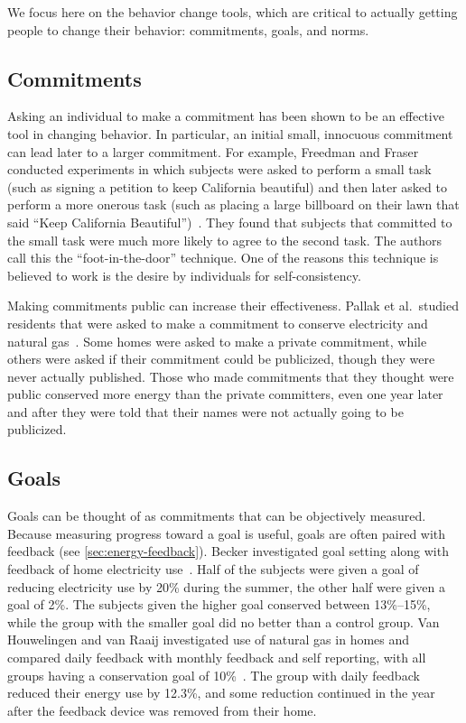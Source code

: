 We focus here on the behavior change tools, which are critical to actually getting people to change their behavior: commitments, goals, and norms.

\subsection{Commitments}
\label{sec:rl-commitments}

Asking an individual to make a commitment has been shown to be an effective tool in changing behavior. In particular, an initial small, innocuous commitment can lead later to a larger commitment. For example, Freedman and Fraser conducted experiments in which subjects were asked to perform a small task (such as signing a petition to keep California beautiful) and then later asked to perform a more onerous task (such as placing a large billboard on their lawn that said ``Keep California Beautiful'')~\cite{Freedman66}. They found that subjects that committed to the small task were much more likely to agree to the second task. The authors call this the ``foot-in-the-door'' technique. One of the reasons this technique is believed to work is the desire by individuals for self-consistency.

Making commitments public can increase their effectiveness. Pallak et al.\ studied residents that were asked to make a commitment to conserve electricity and natural gas~\cite{Pallak80}. Some homes were asked to make a private commitment, while others were asked if their commitment could be publicized, though they were never actually published. Those who made commitments that they thought were public conserved more energy than the private committers, even one year later and after they were told that their names were not actually going to be publicized.

\subsection{Goals}
\label{sec:goals}

Goals can be thought of as commitments that can be objectively measured. Because measuring progress toward a goal is useful, goals are often paired with feedback (see \autoref{sec:energy-feedback}). Becker investigated goal setting along with feedback of home electricity use~\cite{Becker78}. Half of the subjects were given a goal of reducing electricity use by 20\% during the summer, the other half were given a goal of 2\%. The subjects given the higher goal conserved between 13\%--15\%, while the group with the smaller goal did no better than a control group. Van Houwelingen and van Raaij investigated use of natural gas in homes and compared daily feedback with monthly feedback and self reporting, with all groups having a conservation goal of 10\%~\cite{Houwelingen89}. The group with daily feedback reduced their energy use by 12.3\%, and some reduction continued in the year after the feedback device was removed from their home.

